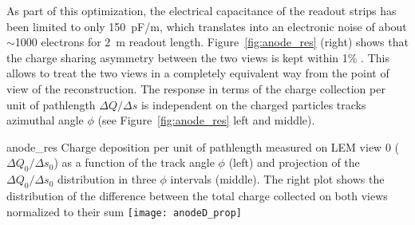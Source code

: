 As part of this optimization, the electrical capacitance of the
readout strips has been limited to only 150~pF/m, which translates
into an electronic noise of about $\sim$1000 electrons for 2~m readout
length.  Figure~\ref{fig:anode_res} (right) shows that the charge
sharing asymmetry between the two views is kept within 1\% . This
allows to treat the two views in a completely equivalent way from the
point of view of the reconstruction. The response in terms of the
charge collection per unit of pathlength $\Delta Q/\Delta s$ is
independent on the charged particles tracks azimuthal angle $\phi$ (see
Figure~\ref{fig:anode_res} left and middle).
\begin{cdrfigure}{anode_res}
{Charge deposition per unit of pathlength measured on LEM view 0 
($\Delta Q_0/\Delta s_0$) as a function  of the track angle $\phi$ (left) and 
projection of the  $\Delta Q_0/\Delta s_0$ distribution in three $\phi$ intervals (middle). 
The right plot  shows the distribution of the difference between the total charge  collected 
on both views normalized to their sum}
\texttt{[image: anodeD\_prop]}
\end{cdrfigure}

